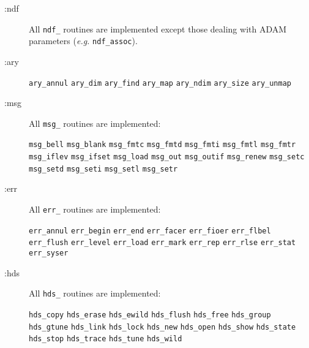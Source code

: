 \documentclass[twoside,11pt]{article}
\begin{document}
\begin{description}

\item[:ndf]%
\mbox{}
All \texttt{ndf\_} routines are implemented except those dealing with
ADAM parameters (\emph{e.g.} \texttt{ndf\_assoc}).

\item[:ary]%
\mbox{}
\begin{flushleft}
\texttt{ary\_annul} \texttt{ary\_dim} \texttt{ary\_find}
\texttt{ary\_map} \texttt{ary\_ndim} \texttt{ary\_size}
\texttt{ary\_unmap}
\end{flushleft}

\item[:msg]%
\mbox{}
All \texttt{msg\_} routines are implemented:
\begin{flushleft}
\texttt{msg\_bell} \texttt{msg\_blank} \texttt{msg\_fmtc}
\texttt{msg\_fmtd} \texttt{msg\_fmti} \texttt{msg\_fmtl}
\texttt{msg\_fmtr} \texttt{msg\_iflev} \texttt{msg\_ifset}
\texttt{msg\_load} \texttt{msg\_out} \texttt{msg\_outif}
\texttt{msg\_renew} \texttt{msg\_setc} \texttt{msg\_setd}
\texttt{msg\_seti} \texttt{msg\_setl} \texttt{msg\_setr}
\end{flushleft}

\item[:err]%
\mbox{}
All \texttt{err\_} routines are implemented:
\begin{flushleft}
\texttt{err\_annul} \texttt{err\_begin} \texttt{err\_end}
\texttt{err\_facer} \texttt{err\_fioer} \texttt{err\_flbel}
\texttt{err\_flush} \texttt{err\_level} \texttt{err\_load}
\texttt{err\_mark} \texttt{err\_rep} \texttt{err\_rlse}
\texttt{err\_stat} \texttt{err\_syser}
\end{flushleft}

\item[:hds]%
\mbox{}
All \texttt{hds\_} routines are implemented:
\begin{flushleft}
\texttt{hds\_copy} \texttt{hds\_erase} \texttt{hds\_ewild}
\texttt{hds\_flush} \texttt{hds\_free} \texttt{hds\_group}
\texttt{hds\_gtune} \texttt{hds\_link} \texttt{hds\_lock}
\texttt{hds\_new} \texttt{hds\_open} \texttt{hds\_show}
\texttt{hds\_state} \texttt{hds\_stop} \texttt{hds\_trace}
\texttt{hds\_tune} \texttt{hds\_wild}
\end{flushleft}


\end{description}
\end{document}
